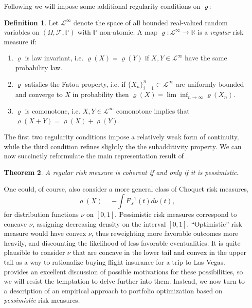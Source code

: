 \documentclass{birkart}
\newtheorem{theorem}{Theorem}[section]
\theoremstyle{definition}
\newtheorem{defn}[theorem]{Definition}
\theoremstyle{remark}
\numberwithin{equation}{section}
\def\RR{\mathbb{R}}
\def\PP{\mathbb{P}}
\def\LL{\mathcal L}
\def\FF{\mathcal F}
\begin{document}
Following  we will impose some additional 
regularity conditions on $\varrho$:
\begin{defn}
Let $\LL^\infty$ denote the space of all bounded 
real-valued random variables on $(\Omega, \FF, \PP)$ with $\PP$ non-atomic.
A map $\varrho: \LL^\infty \rightarrow \RR$ is a {\it regular}
risk measure if: 
\begin{enumerate}
\item[i.]  $\varrho$ is law invariant, i.e. $\varrho(X)=\varrho(Y)$ if
$X,Y \in \LL^\infty$ have the same probability law.
\item[ii.]  $\varrho$ satisfies the Fatou property, 
i.e. if $\{ X_n \}_{i=1}^n \subset \LL^\infty$ are uniformly bounded and 
converge to $X$ in probability 
then $\varrho (X) = \lim\inf_{n \rightarrow \infty} \varrho(X_n)$. 
\item[iii.]  $\varrho$ is comonotone, i.e. 
$X,Y \in \LL^\infty$ comonotone implies that
$\varrho (X+Y) = \varrho (X)  + \varrho (Y) $. 
\end{enumerate}
\end{defn}

The first two regularity conditions impose a relatively weak form of
continuity, while the third condition refines slightly the the subadditivity
property.  We can now succinctly reformulate the main representation 
result of .
\begin{theorem}
A regular risk measure is coherent if and only if it is pessimistic.
\end{theorem}
\vspace{3mm}
One could, of course, also consider a more general class of Choquet risk 
measures,
\[
\varrho (X) = - \int F_X^{-1} (t) d \nu (t),
\]
for distribution functions $\nu$ on $[0,1]$.  
Pessimistic risk measures correspond to concave $\nu$, assigning
decreasing density on the interval $[0,1]$.
``Optimistic'' risk measure would have convex $\nu$, 
thus reweighting more favorable outcomes more heavily, and discounting
the likelihood of less favorable eventualities.
It is quite plausible to consider $\nu$ that are concave in the lower tail
and convex in the upper tail as a way to rationalize 
buying flight insurance for a trip to Las Vegas.
  provides an excellent discussion
of possible motivations for these possibilities, 
so we will resist the temptation to delve further into them. 
Instead,  we now turn to a description of an empirical approach to portfolio
optimization based on {\it pessimistic} risk measures.
\end{document}
